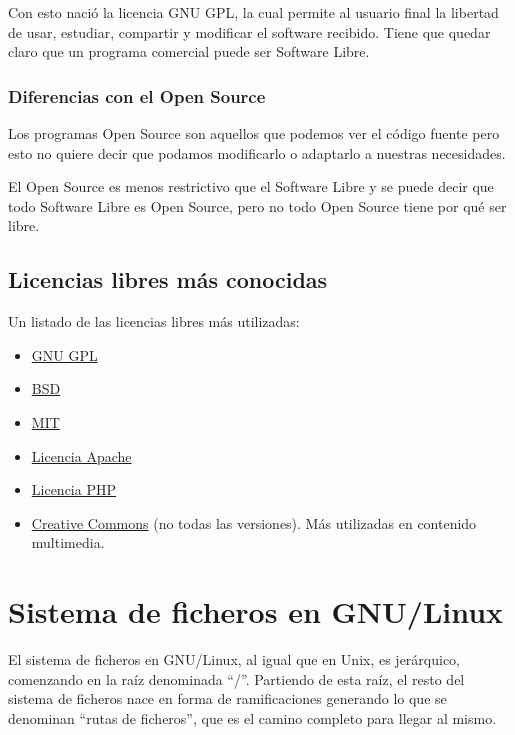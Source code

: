 \documentclass{../../../yukibook.cls/yukibook}
\begin{document}
Con esto nació la licencia GNU GPL, la cual permite al usuario final la libertad de usar, estudiar, compartir y modificar el software recibido. Tiene que quedar claro que un programa comercial puede ser Software Libre.

\subsection{Diferencias con el Open Source}
Los programas Open Source son aquellos que podemos ver el código fuente pero esto no quiere decir que podamos modificarlo o adaptarlo a nuestras necesidades.

El Open Source es menos restrictivo que el Software Libre y se puede decir que todo Software Libre es Open Source, pero no todo Open Source tiene por qué ser libre.


\section{Licencias libres más conocidas}
Un listado de las licencias libres más utilizadas:

\begin{itemize}
    \item \href{https://es.wikipedia.org/wiki/GNU_General_Public_License}{GNU GPL}
    \item \href{https://es.wikipedia.org/wiki/Licencia_BSD}{BSD}
    \item \href{https://es.wikipedia.org/wiki/Licencia_MIT}{MIT}
    \item \href{https://es.wikipedia.org/wiki/Apache_License}{Licencia Apache}
    \item \href{https://es.wikipedia.org/wiki/Licencia_PHP}{Licencia PHP}
    \item \href{https://es.wikipedia.org/wiki/Licencias_Creative_Commons}{Creative Commons} (no todas las versiones). Más utilizadas en contenido multimedia.
\end{itemize}


\chapter{Sistema de ficheros en GNU/Linux}
El sistema de ficheros en GNU/Linux, al igual que en Unix, es jerárquico, comenzando en la raíz denominada “/”. Partiendo de esta raíz, el resto del sistema de ficheros nace en forma de ramificaciones generando lo que se denominan “rutas de ficheros”, que es el camino completo para llegar al mismo.
\end{document}
